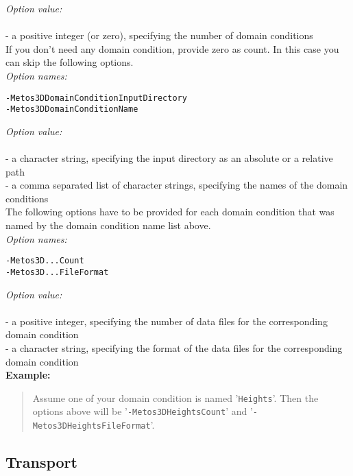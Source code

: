 \documentclass{article}
\begin{document}
\emph{Option value:} \\
\vspace{-0.3cm}\\
- a positive integer (or zero), specifying the number of domain conditions \\

If you don't need any domain condition, provide zero as count.
In this case you can skip the following options. \\

\emph{Option names:}
\begin{verbatim}
-Metos3DDomainConditionInputDirectory
-Metos3DDomainConditionName
\end{verbatim}

\emph{Option value:} \\
\vspace{-0.3cm}\\
- a character string, specifying the input directory as an absolute or a relative path \\
- a comma separated list of character strings, specifying the names of the domain conditions \\

The following options have to be provided for each domain condition
that was named by the domain condition name list above. \\

\emph{Option names:}
\begin{verbatim}
-Metos3D...Count
-Metos3D...FileFormat
\end{verbatim}

\emph{Option value:} \\
\vspace{-0.3cm}\\
- a positive integer, specifying the number of data files for the corresponding domain condition \\
- a character string, specifying the format of the data files for the corresponding domain condition \\

\textbf{Example:}
\begin{quote}
Assume one of your domain condition is named '\texttt{Heights}'. Then the options
above will be '\texttt{-Metos3DHeightsCount}' and '\texttt{-Metos3DHeightsFileFormat}'.
\end{quote}

%
%
\subsection{Transport}
\end{document}
